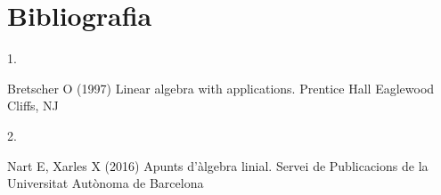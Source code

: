 \documentclass[
  11pt,
]{book}
\newlength{\cslhangindent}
\newlength{\csllabelwidth}
\newlength{\cslentryspacingunit} %
\newenvironment{CSLReferences}[2] %
 {%
  \setlength{\parindent}{0pt}
  \ifodd #1
  \let\oldpar\par
  \def\par{\hangindent=\cslhangindent\oldpar}
  \fi
  \setlength{\parskip}{#2\cslentryspacingunit}
 }%
 {}
\newcommand{\CSLLeftMargin}[1]{\parbox[t]{\csllabelwidth}{#1}}
\newcommand{\CSLRightInline}[1]{\parbox[t]{\linewidth - \csllabelwidth}{#1}\break}
\numberwithin{dummy}{section}
\theoremstyle{maincolornumbox}
\theoremstyle{blacknumex}
\theoremstyle{blacknumbox}
\theoremstyle{maincolornum}
\begin{document}
\nocite{*}

\hypertarget{bibliografia}{%
\chapter*{Bibliografia}\label{bibliografia}}

\hypertarget{refs}{}
\begin{CSLReferences}{0}{0}
\leavevmode{}%
\CSLLeftMargin{1. }%
\CSLRightInline{Bretscher O (1997) Linear algebra with applications. Prentice Hall Eaglewood Cliffs, NJ}

\leavevmode{}%
\CSLLeftMargin{2. }%
\CSLRightInline{Nart E, Xarles X (2016) Apunts d'{à}lgebra linial. Servei de Publicacions de la Universitat Aut{ò}noma de Barcelona}

\end{CSLReferences}
\end{document}

